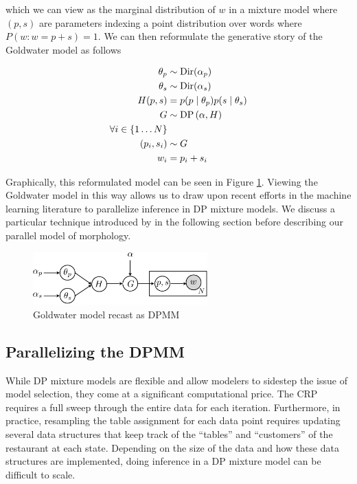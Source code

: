 which we can view as the marginal distribution of $w$ in a mixture
model where $(p,s)$ are parameters indexing a point distribution over
words where $P(w : w = p+s) = 1$. We can then reformulate the
generative story of the Goldwater model as follows

\begin{align*}
  \theta_p & \sim \mathrm{Dir}(\alpha_p) \\
  \theta_s & \sim \mathrm{Dir}(\alpha_s) \\
  H(p, s) & = p(p \mid \theta_p) p(s \mid \theta_s) \\
  G & \sim \mathrm{DP}\left(\alpha, H\right)\\
  \forall i \in \{1 \dots N\} \\
  (p_i, s_i) & \sim G \\
  w_i & = p_i+s_i
\end{align*}

Graphically, this reformulated model can be seen in Figure
\ref{fig:v2}. Viewing the Goldwater model in this way allows us to
draw upon recent efforts in the machine learning literature to
parallelize inference in DP mixture models. We discuss a particular
technique introduced by \cite{williamson2013} in the following section
before describing our parallel model of morphology.

\begin{figure}[h]
\centering
\includegraphics[width=0.6\textwidth]{fig/v2}
\caption{Goldwater model recast as DPMM}
\label{fig:v2}
\end{figure}

\subsection{Parallelizing the DPMM}

While DP mixture models are flexible and allow modelers to sidestep
the issue of model selection, they come at a significant computational
price. The CRP requires a full sweep through the entire data for each
iteration. Furthermore, in practice, resampling the table assignment
for each data point requires updating several data structures that
keep track of the ``tables'' and ``customers'' of the restaurant at
each state. Depending on the size of the data and how these data
structures are implemented, doing inference in a DP mixture model can
be difficult to scale.

